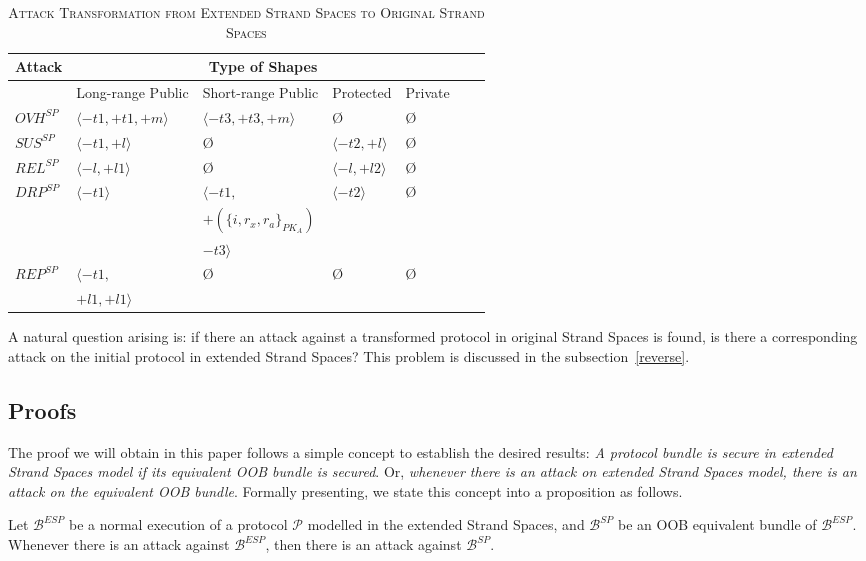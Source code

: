 \begin{table}[b]
\centering
\caption{\textsc{Attack Transformation from Extended Strand Spaces to Original Strand Spaces}}
\label{attacktrans}
{\scriptsize
\begin{tabular}{ l l l l l l l }
\hline
\multicolumn{1}{c}{Attack} & \multicolumn{4}{c}{Type of Shapes} \\
\hline
\hline
 & Long-range Public & Short-range Public & Protected & Private \\
\hline\hline
$OVH^{SP}$ & $\langle -t1,+t1,+m \rangle$ & $ \langle -t3,+t3,+m \rangle$ & \O & \O \\ \hline
$SUS^{SP}$ & $ \langle -t1, +l \rangle$ & \O & $ \langle -t2,+l \rangle$ & \O \\ \hline
$REL^{SP}$ & $\langle -l, +l1 \rangle$ & \O & $ \langle -l,+l2 \rangle$ & \O \\ \hline
$DRP^{SP}$ & $ \langle -t1 \rangle$ & $ \langle -t1,$ & $\langle -t2 \rangle$ & \O \\
  &  & $+(\{i,r_x,r_a\}_{PK_A})$ & \\
  &  & $-t3 \rangle$ & \\ \hline
$REP^{SP}$ & $ \langle -t1, $ & \O & \O & \O \\
 	& $+l1,+l1 \rangle$& & &\\ \hline
\end{tabular}
}
\end{table}

A natural question arising is: if there an attack against a transformed protocol in original Strand Spaces is found, is there a corresponding attack on the initial protocol in extended Strand Spaces? This problem is discussed in the subsection~\ref{reverse}. 

\subsection{Proofs}\label{proof}

The proof we will obtain in this paper follows a simple concept to establish the desired results: \emph{A protocol bundle is secure in extended Strand Spaces model if its equivalent OOB bundle is secured}. Or, \emph{whenever there is an attack on extended Strand Spaces model, there is an attack on the equivalent OOB bundle}. Formally presenting, we state this concept into a proposition as follows. 

\begin{Proposition}
Let $\mathcal{B}^{ESP}$ be a normal execution of a protocol $\mathcal{P}$ modelled in the extended Strand Spaces, and $\mathcal{B}^{SP}$ be an OOB equivalent bundle of $\mathcal{B}^{ESP}$. Whenever there is an attack against $\mathcal{B}^{ESP}$, then there is an attack against $\mathcal{B}^{SP}$. 
\end{Proposition}

